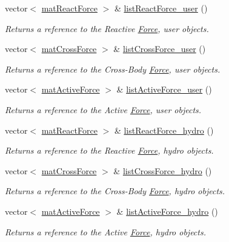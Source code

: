 \begin{DoxyCompactItemize}
vector$<$ \hyperlink{classmat_react_force}{mat\-React\-Force} $>$ \& \hyperlink{classmat_body_a9a477bda31517ad2454c34c0a1942308}{list\-React\-Force\-\_\-user} ()
\begin{DoxyCompactList}\small\item\em Returns a reference to the Reactive \hyperlink{class_force}{Force}, user objects. \end{DoxyCompactList}\item 
vector$<$ \hyperlink{classmat_cross_force}{mat\-Cross\-Force} $>$ \& \hyperlink{classmat_body_a644f523eb34ce98ebbee3a52b35f13f0}{list\-Cross\-Force\-\_\-user} ()
\begin{DoxyCompactList}\small\item\em Returns a reference to the Cross-\/\-Body \hyperlink{class_force}{Force}, user objects. \end{DoxyCompactList}\item 
vector$<$ \hyperlink{classmat_active_force}{mat\-Active\-Force} $>$ \& \hyperlink{classmat_body_a6cce7e3a5be94a9fd7b58ae76809271f}{list\-Active\-Force\-\_\-user} ()
\begin{DoxyCompactList}\small\item\em Returns a reference to the Active \hyperlink{class_force}{Force}, user objects. \end{DoxyCompactList}\item 
vector$<$ \hyperlink{classmat_react_force}{mat\-React\-Force} $>$ \& \hyperlink{classmat_body_a09da411ea6f2934fc36b84c34da8f63d}{list\-React\-Force\-\_\-hydro} ()
\begin{DoxyCompactList}\small\item\em Returns a reference to the Reactive \hyperlink{class_force}{Force}, hydro objects. \end{DoxyCompactList}\item 
vector$<$ \hyperlink{classmat_cross_force}{mat\-Cross\-Force} $>$ \& \hyperlink{classmat_body_ac4e3b6e287af37f0bc89195ed93a3670}{list\-Cross\-Force\-\_\-hydro} ()
\begin{DoxyCompactList}\small\item\em Returns a reference to the Cross-\/\-Body \hyperlink{class_force}{Force}, hydro objects. \end{DoxyCompactList}\item 
vector$<$ \hyperlink{classmat_active_force}{mat\-Active\-Force} $>$ \& \hyperlink{classmat_body_af5e93e715ac8c15cf7a8b29ab6f4a930}{list\-Active\-Force\-\_\-hydro} ()
\begin{DoxyCompactList}\small\item\em Returns a reference to the Active \hyperlink{class_force}{Force}, hydro objects. \end{DoxyCompactList}\end{DoxyCompactItemize}


